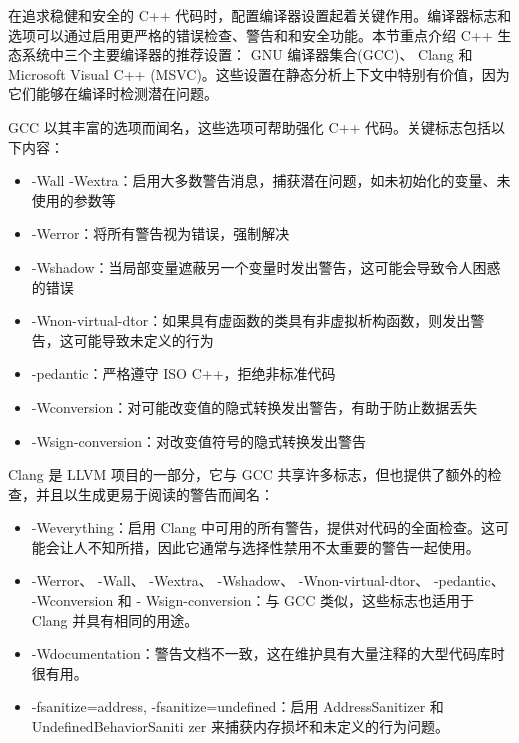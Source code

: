 
在追求稳健和安全的 C++ 代码时，配置编译器设置起着关键作用。编译器标志和选项可以通过启用更严格的错误检查、警告和和安全功能。本节重点介绍 C++ 生态系统中三个主要编译器的推荐设置： GNU 编译器集合(GCC)、 Clang 和 Microsoft Visual C++ (MSVC)。这些设置在静态分析上下文中特别有价值，因为它们能够在编译时检测潜在问题。


GCC 以其丰富的选项而闻名，这些选项可帮助强化 C++ 代码。关键标志包括以下内容：

\begin{itemize}
\item
-Wall -Wextra：启用大多数警告消息，捕获潜在问题，如未初始化的变量、未使用的参数等

\item
-Werror：将所有警告视为错误，强制解决

\item
-Wshadow：当局部变量遮蔽另一个变量时发出警告，这可能会导致令人困惑的错误

\item
-Wnon-virtual-dtor：如果具有虚函数的类具有非虚拟析构函数，则发出警告，这可能导致未定义的行为

\item
-pedantic：严格遵守 ISO C++，拒绝非标准代码

\item
-Wconversion：对可能改变值的隐式转换发出警告，有助于防止数据丢失

\item
-Wsign-conversion：对改变值符号的隐式转换发出警告
\end{itemize}


Clang 是 LLVM 项目的一部分，它与 GCC 共享许多标志，但也提供了额外的检查，并且以生成更易于阅读的警告而闻名：

\begin{itemize}
\item
-Weverything：启用 Clang 中可用的所有警告，提供对代码的全面检查。这可能会让人不知所措，因此它通常与选择性禁用不太重要的警告一起使用。

\item
-Werror、 -Wall、 -Wextra、 -Wshadow、 -Wnon-virtual-dtor、 -pedantic、 -Wconversion 和 - Wsign-conversion：与 GCC 类似，这些标志也适用于 Clang 并具有相同的用途。

\item
-Wdocumentation：警告文档不一致，这在维护具有大量注释的大型代码库时很有用。

\item
-fsanitize=address, -fsanitize=undefined：启用 AddressSanitizer 和 UndefinedBehaviorSaniti zer 来捕获内存损坏和未定义的行为问题。
\end{itemize}

